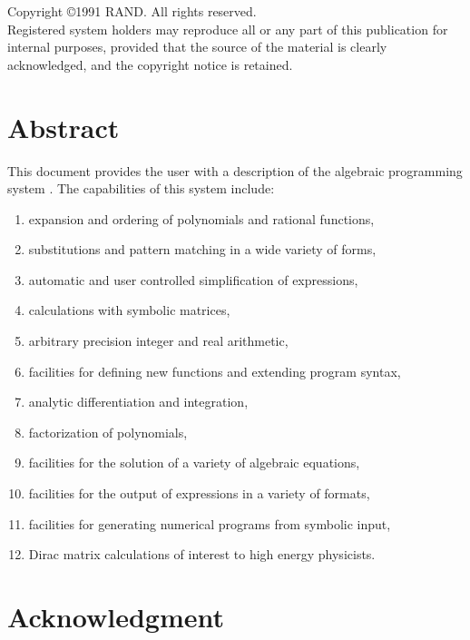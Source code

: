 \newpage
\vspace*{3.0in}
\noindent Copyright \copyright 1991 RAND.  All rights reserved. \\

\noindent Registered system holders may reproduce all or any part of this
publication for internal purposes, provided that the source of the
material is clearly acknowledged, and the copyright notice is retained.

\pagestyle{headings}
\setcounter{page}{0}
\tableofcontents

\chapter*{Abstract}


This document provides the user with a description of the algebraic
programming system {\REDUCE}.  The capabilities of this system include:
\begin{enumerate}
\item expansion and ordering of polynomials and rational functions,
\item substitutions and pattern matching in a wide variety of forms,
\item automatic and user controlled simplification of expressions,
\item calculations with symbolic matrices,
\item arbitrary precision integer and real arithmetic,
\item facilities for defining new functions and extending program syntax,
\item analytic differentiation and integration,
\item factorization of polynomials,
\item facilities for the solution of a variety of algebraic equations,
\item facilities for the output of expressions in a variety of formats,
\item facilities for generating numerical programs from symbolic input,
\item Dirac matrix calculations of interest to high energy physicists.
\end{enumerate}

\chapter*{Acknowledgment}

